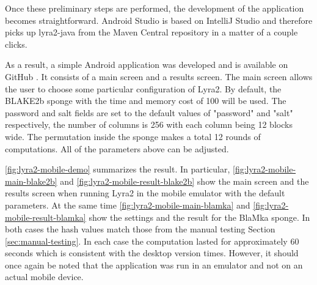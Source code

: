 Once these preliminary steps are performed, the development of the application becomes straightforward. Android Studio is based on IntelliJ Studio and therefore picks up lyra2-java from the Maven Central repository in a matter of a couple clicks.

As a result, a simple Android application was developed and is available on GitHub \cite{github:2017:lyra2-mobile}. It consists of a main screen and a results screen. The main screen allows the user to choose some particular configuration of Lyra2. By default, the BLAKE2b sponge with the time and memory cost of 100 will be used. The password and salt fields are set to the default values of "password" and "salt" respectively, the number of columns is 256 with each column being 12 blocks wide. The permutation inside the sponge makes a total 12 rounds of computations. All of the parameters above can be adjusted.

\autoref{fig:lyra2-mobile-demo} summarizes the result. In particular, \autoref{fig:lyra2-mobile-main-blake2b} and \autoref{fig:lyra2-mobile-result-blake2b} show the main screen and the results screen when running Lyra2 in the mobile emulator with the default parameters. At the same time \autoref{fig:lyra2-mobile-main-blamka} and \autoref{fig:lyra2-mobile-result-blamka} show the settings and the result for the BlaMka sponge. In both cases the hash values match those from the manual testing Section \ref{sec:manual-testing}. In each case the computation lasted for approximately 60 seconds which is consistent with the desktop version times. However, it should once again be noted that the application was run in an emulator and not on an actual mobile device.


